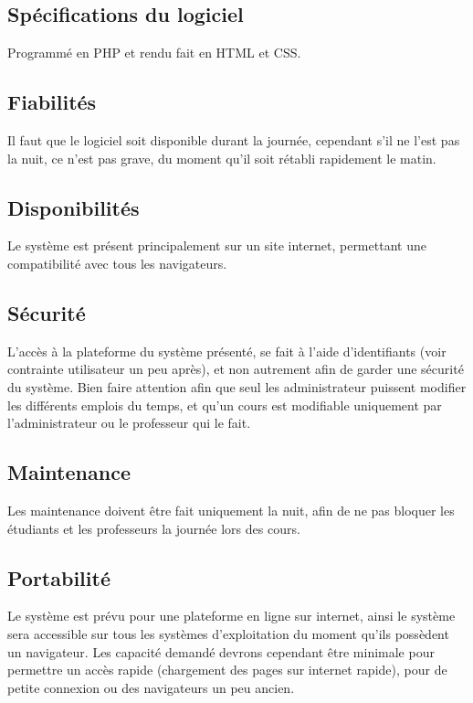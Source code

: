 \documentclass[a4paper, 11pt]{article}
\begin{document}
        \subsection{Spécifications du logiciel}
        Programmé en PHP et rendu fait en HTML et CSS.
        \subsection{Fiabilités}
        Il faut que le logiciel soit disponible durant la journée, cependant s'il ne l'est pas la nuit, ce n'est pas grave, du moment qu'il soit rétabli rapidement le matin. 
        \subsection{Disponibilités}
        Le système est présent principalement sur un site internet, permettant une compatibilité avec tous les navigateurs.
        \subsection{ Sécurité}
        L'accès à la plateforme du système présenté, se fait à l'aide d'identifiants (voir contrainte utilisateur un peu après), et non autrement afin de garder une sécurité du système. Bien faire attention afin que seul les administrateur puissent modifier les différents emplois du temps, et qu'un cours est modifiable uniquement par l'administrateur ou le professeur qui le fait. 
        \subsection{Maintenance}
        Les maintenance doivent être fait uniquement la nuit, afin de ne pas bloquer les étudiants et les professeurs la journée lors des cours.
        \subsection{ Portabilité}
        Le système est prévu pour une plateforme en ligne sur internet, ainsi le système sera accessible sur tous les systèmes d'exploitation du moment qu'ils possèdent un navigateur. Les capacité demandé devrons cependant être minimale pour permettre un accès rapide (chargement des pages sur internet rapide), pour de petite connexion ou des navigateurs un peu ancien.
	\clearpage
\end{document}
